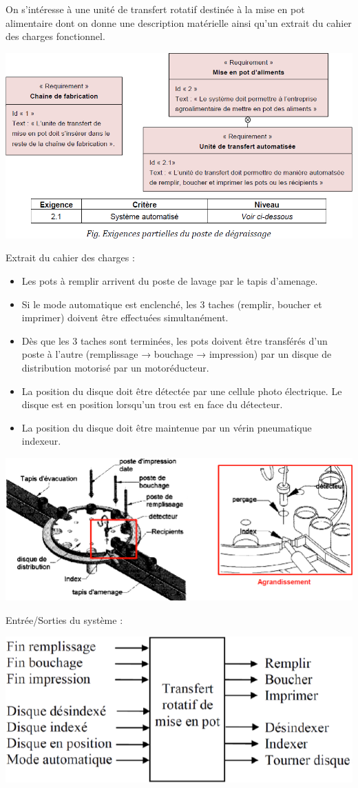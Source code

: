 \documentclass[10pt]{article}
\begin{document}
On s'intéresse à une unité de transfert rotatif destinée à la mise en pot alimentaire dont on
donne une description matérielle ainsi qu’un extrait du cahier des charges fonctionnel.

\begin{center}
\includegraphics[width=.5\textwidth]{images/fig_07}
\end{center}

Extrait du cahier des charges : 
\begin{itemize}
\item Les pots à remplir arrivent du poste de lavage par le tapis d’amenage.
\item Si le mode automatique est enclenché, les 3 taches (remplir, boucher et imprimer) doivent
être effectuées simultanément.
\item Dès que les 3 taches sont terminées, les pots doivent être transférés d’un poste à l’autre
(remplissage → bouchage → impression) par un disque de distribution motorisé par un
motoréducteur.
\item La position du disque doit être détectée par une cellule photo électrique. Le disque est en
position lorsqu’un trou est en face du détecteur.
\item La position du disque doit être maintenue par un vérin pneumatique indexeur.
\end{itemize}

\begin{center}
\includegraphics[width=.5\textwidth]{images/fig_08}
\end{center}

Entrée/Sorties du système :

\begin{center}
\includegraphics[width=.5\textwidth]{images/fig_09}
\end{center}
\end{document}
